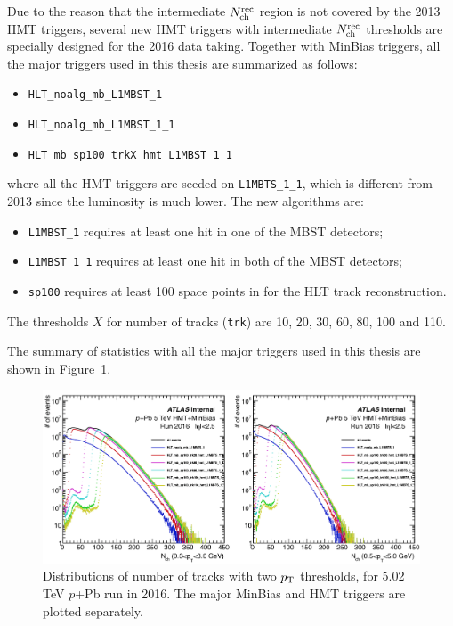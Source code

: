 Due to the reason that the intermediate $N_\text{ch}^\text{rec}$ region is not covered by the 2013 HMT triggers, several new HMT triggers with intermediate $N_\text{ch}^\text{rec}$ thresholds are specially designed for the 2016 data taking. Together with MinBias triggers, all the major triggers used in this thesis are summarized as follows:
\begin{itemize}
\item \verb|HLT_noalg_mb_L1MBST_1|
\item \verb|HLT_noalg_mb_L1MBST_1_1|
\item \verb|HLT_mb_sp100_trkX_hmt_L1MBST_1_1|
\end{itemize}
where all the HMT triggers are seeded on \verb|L1MBTS_1_1|, which is different from 2013 since the luminosity is much lower. The new algorithms are:
\begin{itemize}
\item \verb|L1MBST_1| requires at least one hit in one of the MBST detectors;
\item \verb|L1MBST_1_1| requires at least one hit in both of the MBST detectors;
\item \verb|sp100| requires at least 100 space points in for the HLT track reconstruction.
\end{itemize}
The thresholds $X$ for number of tracks (\verb|trk|) are 10, 20, 30, 60, 80, 100 and 110.

The summary of statistics with all the major triggers used in this thesis are shown in Figure~\ref{fig:detector_ATLAS_trigger_pPb2016}.
\begin{figure}[H]
\centering
\includegraphics[width=.95\linewidth]{figs/chapter_detector/ATLAS_trigger_pPb2016.png}
\caption{Distributions of number of tracks with two $p_\text{T}$ thresholds, for 5.02 TeV $p$+Pb run in 2016. The major MinBias and HMT triggers are plotted separately.}
\label{fig:detector_ATLAS_trigger_pPb2016}
\end{figure}



